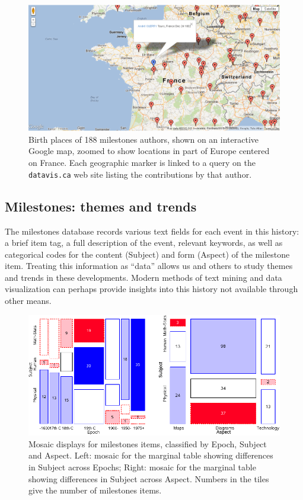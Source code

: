 \documentclass[11pt]{article}
\begin{document}
\begin{figure}[!htb]
  \centering
  \includegraphics[width=\textwidth,clip]{fig/authormap}
  \caption{Birth places of 188 milestones authors, shown on an interactive Google map, zoomed to show locations
  in part of Europe centered on France. Each geographic marker is linked to a query on
  the \texttt{datavis.ca} web site listing the contributions by that author.
  }
  \label{fig:authormap}
\end{figure}

\subsection{Milestones: themes and trends}\label{sec:themes}
The milestones database records various text fields for each event in this history:
a brief item tag, a full description of the event, relevant keywords, as well as categorical
codes for the content (Subject) and form  (Aspect) of the milestone item.
Treating this information as ``data'' allows us and others to study themes and trends
in these developments.  Modern methods of text mining and data visualization 
can perhaps provide insights into this history not available through other means.

\begin{figure}[!htb]
  \centering
  \includegraphics[width=\textwidth,clip]{fig/milecats4}
  \caption{Mosaic displays for milestones items, classified by Epoch, Subject and Aspect.
  Left: mosaic for the marginal table showing differences in Subject across Epochs;
  Right: mosaic for the marginal table showing differences in Subject across Aspect.
  Numbers in the tiles give the number of milestones items.
  }
  \label{fig:milecats4}
\end{figure}
\end{document}
